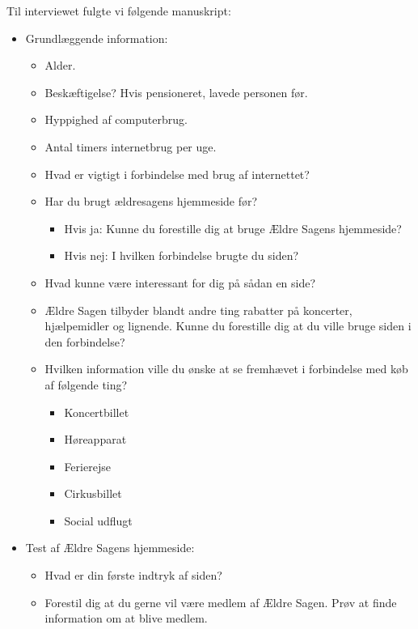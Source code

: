 Til interviewet fulgte vi følgende manuskript:

\begin{itemize}
    \item Grundlæggende information:
    \begin{itemize}
        \item Alder.
        \item Beskæftigelse? Hvis pensioneret, lavede personen før.
        \item Hyppighed af computerbrug.
        \item Antal timers internetbrug per uge.
        \item Hvad er vigtigt i forbindelse med brug af internettet?
        \item Har du brugt ældresagens hjemmeside før?
        \begin{itemize}
            \item Hvis ja: Kunne du forestille dig at bruge Ældre Sagens hjemmeside?
            \item Hvis nej: I hvilken forbindelse brugte du siden?
        \end{itemize}
        \item Hvad kunne være interessant for dig på sådan en side?
        \item Ældre Sagen tilbyder blandt andre ting rabatter på koncerter, hjælpemidler og lignende. Kunne du forestille dig at du ville bruge siden i den forbindelse?
        \item Hvilken information ville du ønske at se fremhævet i forbindelse med køb af følgende ting?
        \begin{itemize}
            \item Koncertbillet
            \item Høreapparat
            \item Ferierejse
            \item Cirkusbillet
            \item Social udflugt
        \end{itemize}
    \end{itemize}
    \item Test af Ældre Sagens hjemmeside:
    \begin{itemize}
        \item Hvad er din første indtryk af siden?
        \item Forestil dig at du gerne vil være medlem af Ældre Sagen. Prøv at finde information om at blive medlem.
        \begin{itemize}

\end{itemize}
\end{itemize}
\end{itemize}
